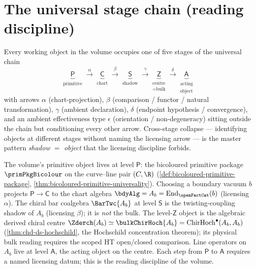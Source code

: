 \section*{The universal stage chain (reading discipline)}

\noindent
Every working object in the volume occupies one of five stages of
the universal chain
\[
\boxed{\;
\underbrace{\mathsf{P}}_{\substack{\text{primitive}}}
 \xrightarrow{\;\alpha\;}
\underbrace{\mathsf{C}}_{\substack{\text{chart}}}
 \xrightarrow{\;\beta\;}
\underbrace{\mathsf{S}}_{\substack{\text{shadow}}}
 \xrightarrow{\;\gamma\;}
\underbrace{\mathsf{Z}}_{\substack{\text{centre} \\ = \text{bulk}}}
 \xrightarrow{\;\delta\;}
\underbrace{\mathsf{A}}_{\substack{\text{acting} \\ \text{object}}}
\;}
\]
with arrows $\alpha$ \textup(chart-projection\textup), $\beta$
\textup(comparison / functor / natural transformation\textup),
$\gamma$ \textup(ambient declaration\textup), $\delta$
\textup(endpoint hypothesis / convergence\textup), and an
ambient effectiveness type $\epsilon$
\textup(orientation / non-degeneracy\textup) sitting outside the
chain but conditioning every other arrow. Cross-stage collapse ---
identifying objects at different stages without naming the
licensing arrow --- is the master pattern \emph{shadow $=$ object}
that the licensing discipline forbids.

The volume's primitive object lives at level $\mathsf{P}$: the
bicoloured primitive package
$\primPkgBicolour$
on the curve--line pair $(C, \R)$
\textup(\cref{def:bicoloured-primitive-package},
\cref{thm:bicoloured-primitive-universality}\textup).
Choosing a boundary vacuum $b$ projects $\mathsf{P} \to \mathsf{C}$
to the chart algebra $\bdyAlg = A_b = \mathrm{End}_{\openFactCat}(b)$
\textup(licensing $\alpha$\textup). The chiral bar coalgebra
$\BarTwc{A_b}$ at level $\mathsf{S}$ is the twisting-coupling
shadow of $A_b$ \textup(licensing $\beta$\textup); it is
\emph{not} the bulk. The level-$\mathsf{Z}$ object is the algebraic
derived chiral centre
$\Zderch(A_b) \simeq \bulkChirHoch{A_b} = \mathrm{ChirHoch}^\bullet(A_b, A_b)$
\textup(\cref{thm:chd-ds-hochschild}, the Hochschild concentration theorem\textup);
its physical bulk reading requires the scoped HT open/closed
comparison.
Line operators on $A_b$ live at level $\mathsf{A}$, the acting
object on the centre. Each step from $\mathsf{P}$ to $\mathsf{A}$
requires a named licensing datum; this is the reading discipline
of the volume.

